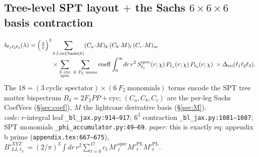 \documentclass[11pt]{article}
\newcommand{\code}[1]{\texttt{\footnotesize #1}}
\newcommand{\eq}[1]{\textsf{#1}}                 %
\newcommand{\chh}{\chi}
\newcommand{\lam}{\lambda}
\begin{document}
\subsection{Tree-level SPT layout $+$ the Sachs $6\times6\times6$ basis contraction}
\begin{equation}
\begin{aligned}
b_{\ell_1\ell_2\ell_3}(\lam)=\Bigl(\tfrac{2}{\pi}\Bigr)^{3}
   &\sum_{k,l,m\in\mathrm{basis}(6)}(C_a\!\cdot\!M)_k\,(C_b\!\cdot\!M)_l\,(C_c\!\cdot\!M)_m\\[-2pt]
   &\times\sum_{\substack{3\ \mathrm{cyc}\\ \mathrm{spec}}}\ \sum_{6\ F_2\ \mathrm{mono}}
     \mathrm{coeff}\int_0^\infty\! dr\,r^2\,
     S^{\mathrm{spec}}_{\ell_c}(r;\chh)\,P_{\ell_a}(r;\chh)\,P_{\ell_b}(r;\chh)\
     \times\Delta_{\mathrm{tri}}(\ell_1\ell_2\ell_3).
\end{aligned}
\label{eq:bllow}
\end{equation}
The $18=(3\ \text{cyclic spectator})\times(6\ F_2\ \text{monomials})$ terms encode the
SPT tree matter bispectrum $B_\delta=2F_2PP+\mathrm{cyc}$; $(C_a,C_b,C_c)$ are the per-leg
Sachs CoefVecs (\S\ref{sec:coef}), $M$ the lightcone derivative basis (\S\ref{sec:M}).\\
\textit{code:} $r$-integral leaf \code{\_bl\_jax.py:914--917}; $6^3$ contraction
\code{\_bl\_jax.py:1081--1087}; SPT monomials \code{\_phi\_accumulator.py:49--69}.\quad
\textit{paper:} this is exactly \eq{eq: appendix b prime} (\code{appendix.tex:667--675}),
$B'^{XYZ}_{LL\ell_3}=(2/\pi)^3\!\int dr\,r^2\sum_{t=0}^{17}c_t\,M'^{\mathrm{spec}}_\ell M'^{\mathrm{PL}}_\ell M'^{\mathrm{PL}}_\ell$.
\end{document}
